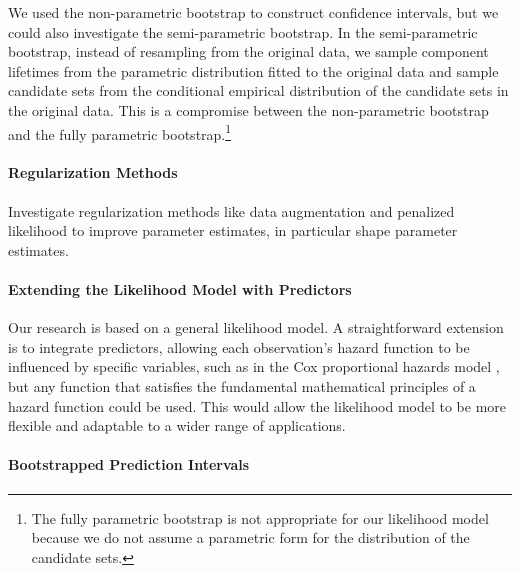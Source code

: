 \documentclass[
]{article}
\theoremstyle{definition}
\theoremstyle{plain}
\theoremstyle{definition}
\theoremstyle{definition}
\theoremstyle{definition}
\theoremstyle{definition}
\theoremstyle{remark}
\begin{document}
We used the non-parametric bootstrap to construct confidence intervals, but we
could also investigate the semi-parametric bootstrap. In the semi-parametric
bootstrap, instead of resampling from the original data, we sample component
lifetimes from the parametric distribution fitted to the original data and
sample candidate sets from the conditional empirical distribution of the
candidate sets in the original data. This is a compromise between the
non-parametric bootstrap and the fully parametric bootstrap.\footnote{The fully parametric bootstrap is not appropriate for our likelihood
  model because we do not assume a parametric form for the distribution of the
  candidate sets.}

\hypertarget{regularization-methods}{%
\paragraph*{Regularization Methods}\label{regularization-methods}}

Investigate regularization methods like data augmentation and penalized
likelihood to improve parameter estimates, in particular shape parameter
estimates.

\hypertarget{extending-the-likelihood-model-with-predictors}{%
\paragraph*{Extending the Likelihood Model with Predictors}\label{extending-the-likelihood-model-with-predictors}}

Our research is based on a general likelihood model. A straightforward extension
is to integrate predictors, allowing each observation's hazard function to be
influenced by specific variables, such as in the Cox proportional hazards model
\citep{cox1972regression}, but any function that satisfies the fundamental
mathematical principles of a hazard function could be used. This would allow
the likelihood model to be more flexible and adaptable to a wider range of
applications.

\hypertarget{bootstrapped-prediction-intervals}{%
\paragraph*{Bootstrapped Prediction Intervals}\label{bootstrapped-prediction-intervals}}
\end{document}
